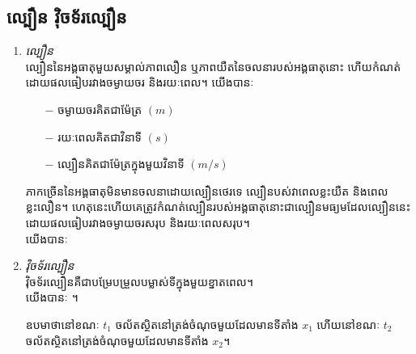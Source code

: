 \subsection{ល្បឿន វុិចទ័រល្បឿន}
\begin{enumerate}[m]
	\item \emph{\kml ល្បឿន}\\
	ល្បឿននៃអង្គធាតុមួយសម្គាល់ភាពលឿន ឬភាពយឺតនៃចលនារបស់អង្គធាតុនោះ ហើយកំណត់ដោយផលធៀបរវាងចម្ងាយចរ និងរយៈពេល។ យើងបានៈ \\
	\begin{multicols}{2}
		\begin{itemize}
			\item [$-$] ចម្ងាយចរគិតជាម៉ែត្រ $\left(m\right)$
			\item [$-$] រយៈពេលគិតជាវិនាទី $\left(s\right)$
			\item [$-$] ល្បឿនគិតជាម៉ែត្រក្នុងមួយវិនាទី $\left(m/s\right)$
		\end{itemize}
	\end{multicols}
	ភាកច្រើននៃអង្គធាតុមិនមានចលនាដោយល្បឿនថេរទេ ល្បឿនបស់វាពេលខ្លះយឺត និងពេលខ្លះលឿន។ ហេតុនេះហើយគេត្រូវកំណត់ល្បឿនរបស់អង្គធាតុនោះជាល្បឿនមធ្យមដែលល្បឿននេះដោយផលធៀបរវាងចម្ងាយចរសរុប និងរយៈពេលសរុប។\\
	យើងបានៈ 
	\item \emph{\kml វុិចទ័រល្បឿន}\\
	វុិចទ័រល្បឿនគឺជាបម្រែបម្រួលបម្លាស់ទីក្នុងមួយខ្នាតពេល។\\
	យើងបានៈ ។
	\begin{multicols}{2}
		ឧបមាថានៅខណៈ $t_{1}$ ចល័តស្ថិតនៅត្រង់ចំណុចមួយដែលមានទីតាំង $x_{1}$ ហើយនៅខណៈ $t_{2}$ ចល័តស្ថិតនៅត្រង់ចំណុចមួយដែលមានទីតាំង $x_{2}$។
		\begin{figure}[H]
			\centering

\end{figure}
\end{multicols}
\end{enumerate}
